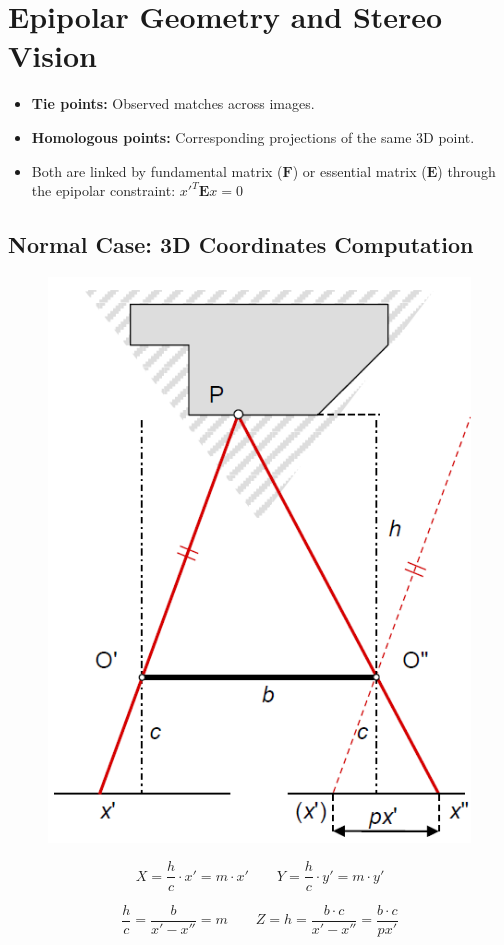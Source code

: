 \section{Epipolar Geometry and Stereo Vision}

\begin{itemize}
	\item \textbf{Tie points:} Observed matches across images.
	\item \textbf{Homologous points:} Corresponding projections of the same 3D point.
	\item Both are linked by fundamental matrix (\(\mathbf{F}\)) or essential matrix (\(\mathbf{E}\)) through the epipolar constraint: \(x'^T\mathbf{E}x = 0\)
\end{itemize}
\subsection{Normal Case: 3D Coordinates Computation}
\begin{figure}[ht]
    \centering
    \includegraphics[width = 0.5\columnwidth]{Images/11/normalcase.png}
    \label{fig:normalcase}
\end{figure}
\[
X = \frac{h}{c} \cdot x' = m \cdot x'
\qquad
Y = \frac{h}{c} \cdot y' = m \cdot y'
\]

\[
\frac{h}{c} = \frac{b}{x' - x''} = m
\qquad
Z = h = \frac{b \cdot c}{x' - x''} = \frac{b \cdot c}{p x'}
\]